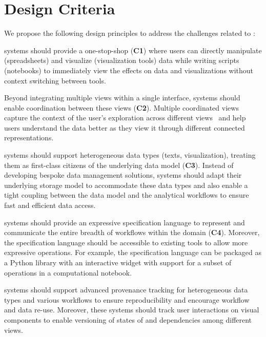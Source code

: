 \section{Design Criteria} 
\label{sec:design}
We propose the following design principles to address the challenges related to \vita:

\vita systems should provide a one-stop-shop (\textbf{C1}) where users can directly
manipulate (spreadsheets) and visualize (visualization tools) data while writing scripts (notebooks) to immediately view the effects on data and visualizations without context switching between tools.

Beyond integrating multiple views within a single interface, \vita systems should enable coordination between these views (\textbf{C2}).
Multiple coordinated views capture the context of the user's exploration across different views~\cite{wang2000guidelines} and help users understand the data better as they view it through different connected representations.

\vita systems should support heterogeneous data types (\eg texts, visualization), treating them as first-class citizens of the underlying data model (\textbf{C3}). Instead of developing bespoke data management solutions, \vita systems should adapt their underlying storage model to
accommodate these data types and also enable a tight coupling between the data model and the analytical workflows to ensure fast and efficient data access.

\vita systems should provide an expressive specification language to represent and communicate the entire breadth of workflows within the domain (\textbf{C4}). 
Moreover, the specification language should be accessible to existing tools to allow more expressive operations. 
For example, the specification language can be packaged as a Python library with an interactive widget with support for a subset of \vita operations in a computational notebook.

\vita systems should support advanced provenance tracking for heterogeneous data types and various workflows to ensure reproducibility and encourage workflow and data re-use. 
Moreover, these systems should track user interactions on visual components to enable versioning of states of and dependencies among different views.


